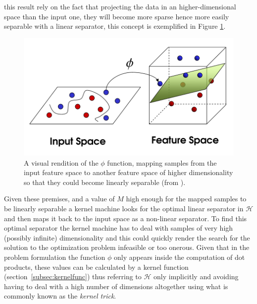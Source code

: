 this result rely on the fact that projecting the data in an higher-dimensional
space than the input one, they will become more sparse hence more easily separable
with a linear separator, this concept is exemplified in Figure \ref{fig:phi}.

\begin{figure}[ht]
    \centering
    \includegraphics[scale=0.4]{Figures/phi}
    \caption{A visual rendition of the $\phi$ function, mapping samples from the
    input feature space to another feature space of higher dimensionality so that
    they could become linearly separable (from \cite{rtesselli}).}
    \label{fig:phi}
\end{figure}

Given these premises, and a value of $M$ high enough for the mapped samples to
be linearly separable a kernel machine looks for the optimal linear separator in
$\mathcal{H}$ and then maps it back to the input space as a non-linear separator.
To find this optimal separator the kernel machine has to deal with samples of
very high (possibly infinite) dimensionality and this could quickly render the
search for the solution to the optimization problem infeasible or too onerous.
Given that in the problem formulation the function $\phi$ only appears inside
the computation of dot products, these values can be calculated by a kernel
function (section~\ref{subsec:kernelfunc}) thus referring to $\mathcal{H}$
only implicitly and avoiding having to deal with a high number of dimensions
altogether using what is commonly known as the \emph{kernel trick}.

